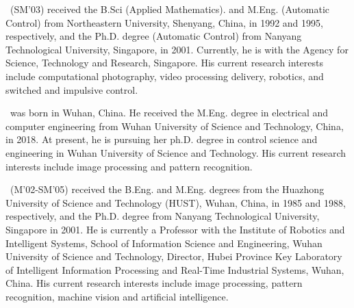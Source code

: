 \documentclass[a4paper,fleqn]{cas-dc}
\begin{document}
\par\noindent 
\parbox[t]{\linewidth}{
	 \ (SM’03) received the B.Sci (Applied Mathematics). and M.Eng. (Automatic Control) from Northeastern University, Shenyang, China, in 1992 and 1995, respectively, and the Ph.D. degree (Automatic Control) from Nanyang Technological University, Singapore, in 2001. Currently, he is with the Agency for Science, Technology and Research, Singapore. His current research interests include computational photography, video processing  delivery, robotics, and switched and impulsive control.}
\vspace{1\baselineskip}

\par\noindent 
\parbox[t]{\linewidth}{
	 \ was born in Wuhan, China. He received the M.Eng. degree in electrical and computer engineering from Wuhan University of Science and Technology, China, in 2018. At present, he is pursuing her ph.D. degree in control science and engineering in Wuhan University of Science and Technology. His current research interests include image processing and pattern recognition.}
\vspace{1\baselineskip}

\par\noindent 
\parbox[t]{\linewidth}{
	 \ (M’02-SM’05) received the B.Eng. and M.Eng. degrees from the Huazhong University of Science and Technology (HUST), Wuhan, China, in 1985 and 1988, respectively, and the Ph.D. degree from Nanyang Technological University, Singapore in 2001. He is currently a Professor with the Institute of Robotics and Intelligent Systems, School of Information Science and Engineering, Wuhan University of Science and Technology, Director, Hubei Province Key Laboratory of Intelligent Information Processing and Real-Time Industrial Systems, Wuhan, China. His current research interests include image processing, pattern recognition, machine vision and artificial intelligence.}
\vspace{1\baselineskip}
\end{document}
